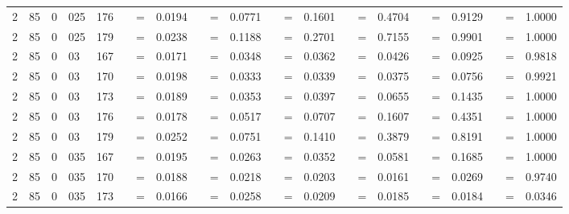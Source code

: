 \begin{tabular*}{260mm}{r@{.}lr@{.}lc|ccc:ccc:ccc:ccc:ccc|ccc}
		2&85	&	0&025	&	176	&	 &=& 0.0194 & 	 &=& 0.0771 & 	 &=& 0.1601 & 	 &=& 0.4704 & 	 &=& 0.9129 & 	 &=& 1.0000 \\ 
		2&85	&	0&025	&	179	&	 &=& 0.0238 & 	 &=& 0.1188 & 	 &=& 0.2701 & 	 &=& 0.7155 & 	 &=& 0.9901 & 	 &=& 1.0000 \\ 
		2&85	&	0&03	&	167	&	 &=& 0.0171 & 	 &=& 0.0348 & 	 &=& 0.0362 & 	 &=& 0.0426 & 	 &=& 0.0925 & 	 &=& 0.9818 \\ 
		2&85	&	0&03	&	170	&	 &=& 0.0198 & 	 &=& 0.0333 & 	 &=& 0.0339 & 	 &=& 0.0375 & 	 &=& 0.0756 & 	 &=& 0.9921 \\ 
		2&85	&	0&03	&	173	&	 &=& 0.0189 & 	 &=& 0.0353 & 	 &=& 0.0397 & 	 &=& 0.0655 & 	 &=& 0.1435 & 	 &=& 1.0000 \\ 
		2&85	&	0&03	&	176	&	 &=& 0.0178 & 	 &=& 0.0517 & 	 &=& 0.0707 & 	 &=& 0.1607 & 	 &=& 0.4351 & 	 &=& 1.0000 \\ 
		2&85	&	0&03	&	179	&	 &=& 0.0252 & 	 &=& 0.0751 & 	 &=& 0.1410 & 	 &=& 0.3879 & 	 &=& 0.8191 & 	 &=& 1.0000 \\ 
		2&85	&	0&035	&	167	&	 &=& 0.0195 & 	 &=& 0.0263 & 	 &=& 0.0352 & 	 &=& 0.0581 & 	 &=& 0.1685 & 	 &=& 1.0000 \\ 
		2&85	&	0&035	&	170	&	 &=& 0.0188 & 	 &=& 0.0218 & 	 &=& 0.0203 & 	 &=& 0.0161 & 	 &=& 0.0269 & 	 &=& 0.9740 \\ 
		2&85	&	0&035	&	173	&	 &=& 0.0166 & 	 &=& 0.0258 & 	 &=& 0.0209 & 	 &=& 0.0185 & 	 &=& 0.0184 & 	 &=& 0.0346 \\ 

\end{tabular*}
